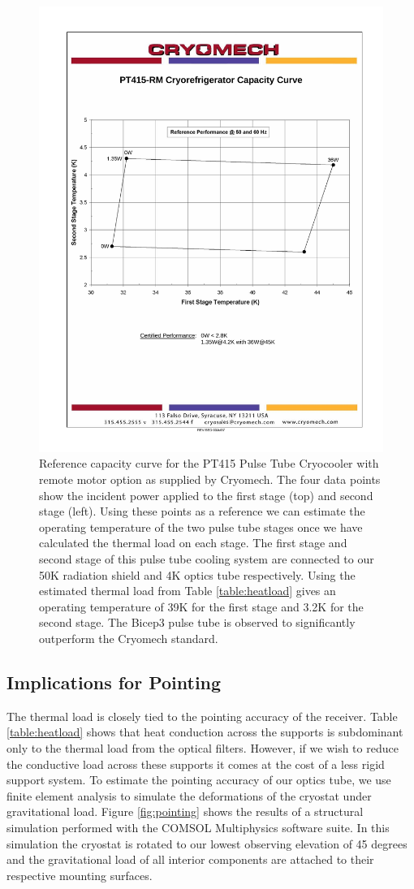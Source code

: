 \documentclass[12pt]{article}
\begin{document}
\begin{figure}
	\center
	\includegraphics[clip, trim=.8in 3.5in .7in 2.5in,  width=.7\textwidth]{PT415RM_cc.pdf}
	\caption{Reference capacity curve for the PT415 Pulse Tube Cryocooler with
	remote motor option as supplied by Cryomech. The four data points show the
	incident power applied to the first stage (top) and second stage (left).
	Using these points as a reference we can estimate the operating
	temperature of the two pulse tube stages once we have calculated the
	thermal load on each stage. The first stage and second stage of this pulse
	tube cooling system are connected to our 50K radiation shield and 4K
	optics tube respectively. Using the estimated thermal
	load from Table \ref{table:heatload} gives an operating temperature of 39K
	for the first stage and 3.2K for the second stage. The Bicep3 pulse tube
	is observed to significantly outperform the Cryomech standard.}
	\label{fig:capcurve}



\end{figure}



\subsection{Implications for Pointing}
The thermal load is closely tied to the pointing accuracy of the receiver.
Table \ref{table:heatload} shows that heat conduction across the supports is
subdominant only to the thermal load from the optical filters. However, if we
wish to reduce the conductive load across these supports it comes at the cost
of a less rigid support system. To estimate the pointing accuracy of our
optics tube, we use finite element analysis to simulate the deformations of
the cryostat under gravitational load. Figure \ref{fig:pointing} shows the
results of a structural simulation performed with the COMSOL Multiphysics
software suite. In this simulation the cryostat is rotated to our lowest
observing elevation of 45 degrees and the gravitational load of all interior
components are attached to their respective mounting surfaces. 
\end{document}
